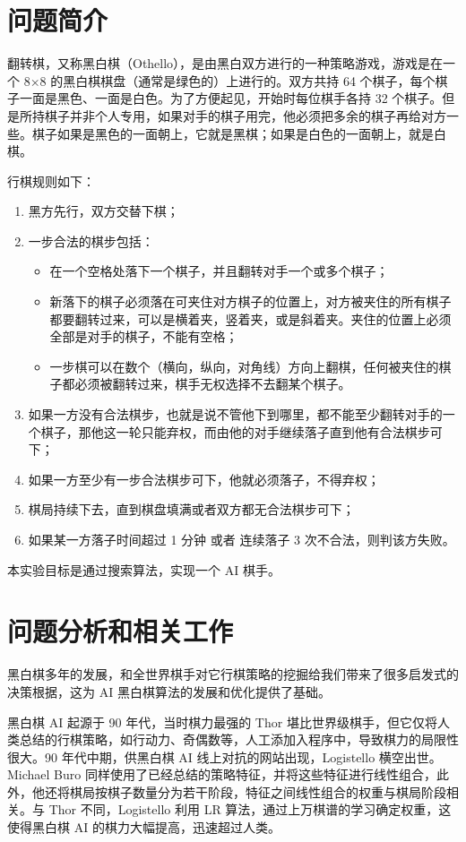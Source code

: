 \documentclass{zjureport-zh}
\begin{document}
\makecover

\section{问题简介}
\par 翻转棋，又称黑白棋（Othello），是由黑白双方进行的一种策略游戏，游戏是在一个 8×8 的黑白棋棋盘（通常是绿色的）上进行的。双方共持 64 个棋子，每个棋子一面是黑色、一面是白色。为了方便起见，开始时每位棋手各持 32 个棋子。但是所持棋子并非个人专用，如果对手的棋子用完，他必须把多余的棋子再给对方一些。棋子如果是黑色的一面朝上，它就是黑棋；如果是白色的一面朝上，就是白棋。
\par 行棋规则如下：
\begin{enumerate}
	\item 黑方先行，双方交替下棋；
	\item 一步合法的棋步包括：
	\begin{itemize}
		\item 在一个空格处落下一个棋子，并且翻转对手一个或多个棋子；
		\item 新落下的棋子必须落在可夹住对方棋子的位置上，对方被夹住的所有棋子都要翻转过来，可以是横着夹，竖着夹，或是斜着夹。夹住的位置上必须全部是对手的棋子，不能有空格；
		\item 一步棋可以在数个（横向，纵向，对角线）方向上翻棋，任何被夹住的棋子都必须被翻转过来，棋手无权选择不去翻某个棋子。
	\end{itemize}
	\item 如果一方没有合法棋步，也就是说不管他下到哪里，都不能至少翻转对手的一个棋子，那他这一轮只能弃权，而由他的对手继续落子直到他有合法棋步可下；
	\item 如果一方至少有一步合法棋步可下，他就必须落子，不得弃权；  
	\item 棋局持续下去，直到棋盘填满或者双方都无合法棋步可下；
	\item 如果某一方落子时间超过 1 分钟 或者 连续落子 3 次不合法，则判该方失败。  
\end{enumerate}
\par 本实验目标是通过搜索算法，实现一个 AI 棋手。

\section{问题分析和相关工作}
\par 黑白棋多年的发展，和全世界棋手对它行棋策略的挖掘给我们带来了很多启发式的决策根据，这为 AI 黑白棋算法的发展和优化提供了基础。
\par 黑白棋 AI 起源于 90 年代，当时棋力最强的 Thor 堪比世界级棋手，但它仅将人类总结的行棋策略，如行动力、奇偶数等，人工添加入程序中，导致棋力的局限性很大。90 年代中期，供黑白棋 AI 线上对抗的网站出现，Logistello 横空出世。Michael Buro 同样使用了已经总结的策略特征，并将这些特征进行线性组合，此外，他还将棋局按棋子数量分为若干阶段，特征之间线性组合的权重与棋局阶段相关。与 Thor 不同，Logistello 利用 LR 算法，通过上万棋谱的学习确定权重，这使得黑白棋 AI 的棋力大幅提高，迅速超过人类。
\end{document}
